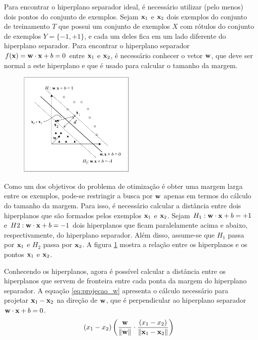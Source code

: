 Para encontrar o hiperplano separador ideal, é necessário utilizar (pelo menos) dois pontos do conjunto de exemplos. Sejam $\mathbf{x}_1$ e $\mathbf{x}_2$ dois exemplos do conjunto de treinamento $T$ que possui um conjunto de exemplos $X$ com rótulos do conjunto de exemplos $Y = \{-1, +1\}$, e cada um deles fica em um lado diferente do hiperplano separador. Para encontrar o hiperplano separador $f(\mathbf{x}) = \mathbf{w}\cdot\mathbf{x} + b = 0$ entre $\mathbf{x}_1$ e $\mathbf{x}_2$, é necessário conhecer o vetor $\mathbf{w}$, que deve ser normal a este hiperplano e que é usado para calcular o tamanho da margem.

\begin{figure}[h!]
  \centering
  \includegraphics[width=0.5\textwidth]{img/fig-hiperplanos.png}
  \label{fig:hiperplanos}
\end{figure}

Como um dos objetivos do problema de otimização é obter uma margem larga entre os exemplos, pode-se restringir a busca por $\mathbf{w}$ apenas em termos do cálculo do tamanho da margem. Para isso, é necessário calcular a distância entre dois hiperplanos que são formados pelos exemplos $\mathbf{x}_1$ e $\mathbf{x}_2$. Sejam $H_1: \mathbf{w}\cdot\mathbf{x} + b = +1$ e $H2: \mathbf{w}\cdot\mathbf{x} +b = -1$ dois hiperplanos que ficam paralelamente acima e abaixo, respectivamente, do hiperplano separador. Além disso, assume-se que $H_1$ passa por $\mathbf{x}_1$ e $H_2$ passa por $\mathbf{x}_2$. A figura \ref{fig:hiperplanos} mostra a relação entre os hiperplanos e os pontos $\mathbf{x}_1$ e $\mathbf{x}_2$.

Conhecendo os hiperplanos, agora é possível calcular a distância entre os hiperplanos que servem de fronteira entre cada ponta da margem do hiperplano separador. A equação \ref{eq:projecao_w} apresenta o cálculo necessário para projetar $\mathbf{x}_1 - \mathbf{x}_2$ na direção de $\mathbf{w}$, que é perpendicular ao hiperplano separador $\mathbf{w}\cdot\mathbf{x} + b = 0$.
\begin{equation}\label{eq:projecao_w}
  (x_1 - x_2)
    \left(
      \frac{ \mathbf{w} }{ \lVert \mathbf{w} \rVert }
      \cdot
      \frac{(x_1 - x_2)}{ \lVert \mathbf{x}_1 - \mathbf{x}_2 \rVert }
    \right)
\end{equation}

